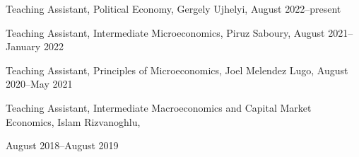 \documentclass[10pt,letterpaper]{article}
\renewenvironment{itemize}{
  \begin{list}{}{
    \setlength{\leftmargin}{1.5em}
  }
}{
  \end{list}
}
\begin{document}
\begin{itemize}
\begin{itemize}
\item Teaching Assistant, Political Economy, Gergely Ujhelyi,
  August 2022--present
\item Teaching Assistant, Intermediate Microeconomics, Piruz Saboury,
  August 2021--January 2022
\item Teaching Assistant, Principles of Microeconomics, Joel Melendez Lugo,
  August 2020--May 2021
\item Teaching Assistant, Intermediate Macroeconomics and  Capital Market Economics, Islam Rizvanoghlu, 

\qquad August 2018--August 2019
\end{itemize}


\end{itemize}
\end{document}
